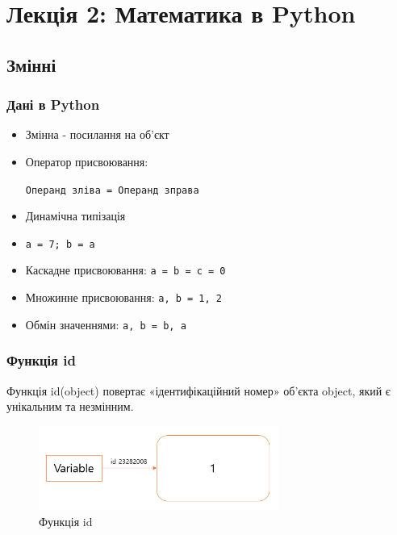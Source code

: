 \section*{Лекція 2: Математика в Python}

\subsection{Змінні}
 
\begin{frame}
\frametitle{Дані в Python}
\begin{itemize}
  \item Змінна - посилання на об'єкт
  \item Оператор присвоювання: 
  
  \texttt{Операнд зліва = Операнд зправа}
  \item Динамічна типізація
  \item \texttt{a = 7; b = a}
  \item Каскадне присвоювання: \texttt{a = b = c = 0}
  \item Множинне присвоювання: \texttt{a, b = 1, 2}
  \item Обмін значеннями: \texttt{a, b = b, a}
\end{itemize}
\end{frame}

\begin{frame}
\frametitle{Функція id}
Функція id(object) повертає «ідентифікаційний номер» об'єкта object, який є унікальним та незмінним.
\begin{figure}
\begin{center}
 \includegraphics[width=0.7\textwidth]{pictures/id_func.png}
\caption{Функція id}
\label{id} 
\end{center}
\end{figure}
\end{frame}

